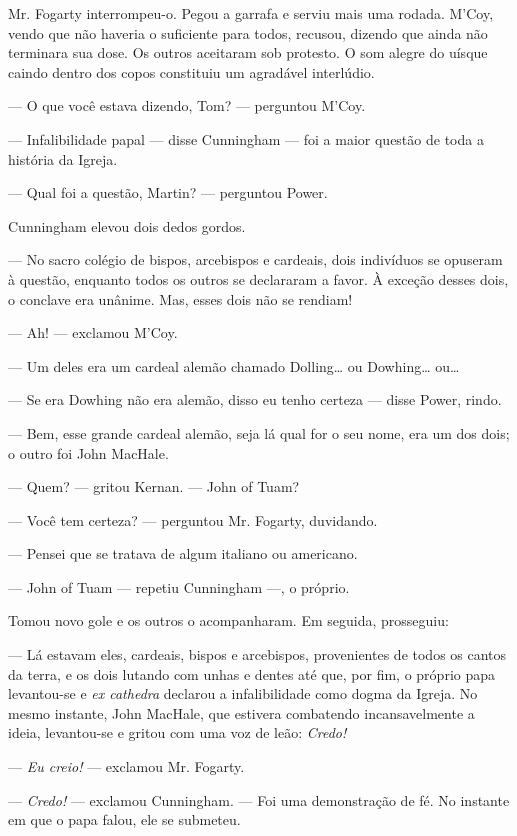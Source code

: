 Mr. Fogarty interrompeu-o. Pegou a garrafa e serviu mais uma rodada.
M'Coy, vendo que não haveria o suficiente para todos, recusou,
dizendo que ainda não terminara sua dose. Os outros aceitaram sob
protesto. O som alegre do uísque caindo dentro dos copos constituiu
um agradável interlúdio.

--- O que você estava dizendo, Tom? --- perguntou M'Coy.

--- Infalibilidade papal --- disse Cunningham --- foi a maior questão
de toda a história da Igreja.

--- Qual foi a questão, Martin? --- perguntou Power.

Cunningham elevou dois dedos gordos.

--- No sacro colégio de bispos, arcebispos e cardeais, dois indivíduos
se opuseram à questão, enquanto todos os outros se declararam a favor.
À exceção desses dois, o conclave era unânime. Mas, esses dois não
se rendiam!

--- Ah! --- exclamou M'Coy.

--- Um deles era um cardeal alemão chamado Dolling\ldots{} ou Dowhing\ldots{}
ou\ldots{}

--- Se era Dowhing não era alemão, disso eu tenho certeza ---
disse Power, rindo.

--- Bem, esse grande cardeal alemão, seja lá qual for o seu nome, era
um dos dois; o outro foi John MacHale.

--- Quem? --- gritou Kernan. --- John of Tuam?

--- Você tem certeza? --- perguntou Mr. Fogarty, duvidando.

--- Pensei que se tratava de algum italiano ou americano.

--- John of Tuam --- repetiu Cunningham ---, o próprio.

Tomou novo gole e os outros o acompanharam. Em seguida, prosseguiu:

--- Lá estavam eles, cardeais, bispos e arcebispos, provenientes de
todos os cantos da terra, e os dois lutando com unhas e dentes até
que, por fim, o próprio papa levantou-se e \textit{ex cathedra} declarou a
infalibilidade como dogma da Igreja. No mesmo instante, John MacHale,
que estivera combatendo incansavelmente a ideia, levantou-se e
gritou com uma voz de leão: \textit{Credo!}

--- \textit{Eu creio!} --- exclamou Mr. Fogarty.

--- \textit{Credo!} --- exclamou Cunningham. --- Foi uma demonstração de fé. No
instante em que o papa falou, ele se submeteu.

